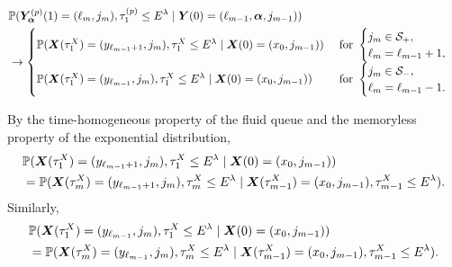\begin{align}
	& \mathbb P(\bm{Y}_{\bm{\alpha}}^{(p)}(1) = (\ell_m, j_m), \tau_{1}^{(p)}\leq E^\lambda 
            	 \mid \boldsymbol Y(0) = (\ell_{m-1},\boldsymbol \alpha, j_{m-1}))\nonumber
	\\&\to\begin{cases}
	 	\mathbb P(\boldsymbol X(\tau_1^X) =( y_{\ell_{m-1}+1},j_m), \tau_{1}^X\leq E^\lambda 
            	 \mid \boldsymbol X(0) = (x_0, j_{m-1}))  
	 &\text{ for }\begin{cases} j_m\in\mathcal{S}_+,\\ \ell_m=\ell_{m-1}+1,\end{cases}\\
	 	\mathbb P(\boldsymbol X(\tau_1^X) = (y_{\ell_{m-1}}, j_m), \tau_{1}^X\leq E^\lambda 
            	 \mid \boldsymbol X(0) = (x_0, j_{m-1}))  & \text{ for }\begin{cases}j_m\in\mathcal{S}_-,&\\ \ell_m=\ell_{m-1}-1.&\end{cases}
\end{cases}\label{eqn:kknvf fawoprgj v2}
\end{align}

By the time-homogeneous property of the fluid queue and the memoryless property of the exponential distribution, 
\begin{align}
	&\mathbb P(\boldsymbol X(\tau_1^X) = (y_{\ell_{m-1}+1}, j_m), \tau_{1}^X\leq E^\lambda 
            	 \mid \boldsymbol X(0) = (x_0, j_{m-1})) \nonumber
	 \\&=\mathbb P(\boldsymbol X(\tau_m^X) = (y_{\ell_{m-1}+1}, j_m), \tau_{m}^X\leq E^\lambda 
            	 \mid \boldsymbol X(\tau_{m-1}^X) = (x_0, j_{m-1}), \nonumber 
	\tau_{m-1}^X\leq E^{\lambda}).
\end{align}
Similarly, 
\begin{align}
	&\mathbb P(\boldsymbol X(\tau_1^X) = (y_{\ell_{m-1}}, j_m), \tau_{1}^X\leq E^\lambda 
            	 \mid \boldsymbol X(0) = (x_0, j_{m-1})) \nonumber
	 \\&=\mathbb P(\boldsymbol X(\tau_m^X) = (y_{\ell_{m-1}}, j_m), \tau_{m}^X\leq E^\lambda 
            	 \mid \boldsymbol X(\tau_{m-1}^X) = (x_0, j_{m-1}), \tau_{m-1}^X\leq E^\lambda).
\end{align}

